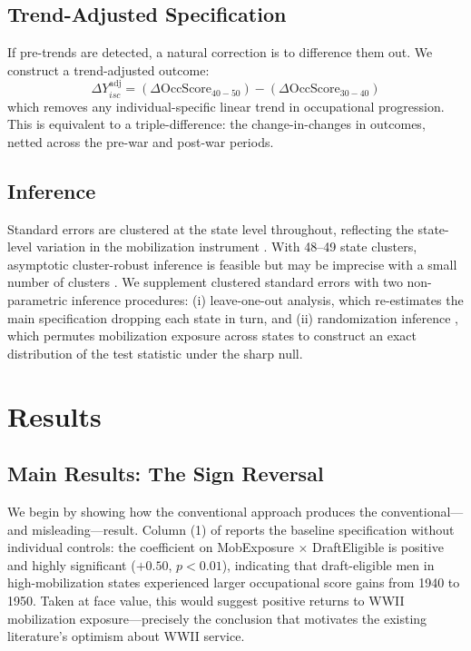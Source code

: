 \documentclass[12pt]{article}
\begin{document}
\subsection{Trend-Adjusted Specification}

If pre-trends are detected, a natural correction is to difference them out. We construct a trend-adjusted outcome:
\begin{equation}
\Delta Y_{isc}^{\text{adj}} = (\Delta \text{OccScore}_{40-50}) - (\Delta \text{OccScore}_{30-40})
\end{equation}
which removes any individual-specific linear trend in occupational progression. This is equivalent to a triple-difference: the change-in-changes in outcomes, netted across the pre-war and post-war periods.

\subsection{Inference}

Standard errors are clustered at the state level throughout, reflecting the state-level variation in the mobilization instrument \citep{bertrand2004}. With 48--49 state clusters, asymptotic cluster-robust inference is feasible but may be imprecise with a small number of clusters \citep{conleytaber2011}. We supplement clustered standard errors with two non-parametric inference procedures: (i) leave-one-out analysis, which re-estimates the main specification dropping each state in turn, and (ii) randomization inference \citep{fisher1935, young2019}, which permutes mobilization exposure across states to construct an exact distribution of the test statistic under the sharp null.

\section{Results}

\subsection{Main Results: The Sign Reversal}

We begin by showing how the conventional approach produces the conventional---and misleading---result. Column (1) of  reports the baseline specification without individual controls: the coefficient on MobExposure $\times$ DraftEligible is positive and highly significant ($+0.50$, $p < 0.01$), indicating that draft-eligible men in high-mobilization states experienced larger occupational score gains from 1940 to 1950. Taken at face value, this would suggest positive returns to WWII mobilization exposure---precisely the conclusion that motivates the existing literature's optimism about WWII service.
\end{document}
